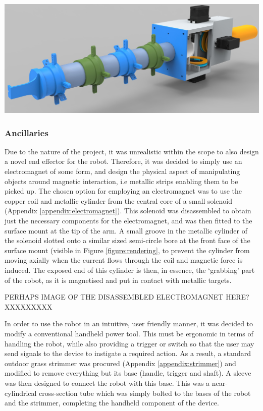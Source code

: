 \documentclass[11pt]{article}
\begin{document}
\begin{center}
\includegraphics[width=\textwidth]{images/rendering.png}
\label{figure:rendering}
\end{center}

\subsubsection{Ancillaries}
Due to the nature of the project, it was unrealistic within the scope to also design a novel end effector for the robot. Therefore, it was decided to simply use an electromagnet of some form, and design the physical aspect of manipulating objects around magnetic interaction, i.e metallic strips enabling them to be picked up. The chosen option for employing an electromagnet was to use the copper coil and metallic cylinder from the central core of a small solenoid (Appendix \ref{appendix:electromagnet}). This solenoid was disassembled to obtain just the necessary components for the electromagnet, and was then fitted to the surface mount at the tip of the arm. A small groove in the metallic cylinder of the solenoid slotted onto a similar sized semi-circle bore at the front face of the surface mount (visible in Figure \ref{figure:rendering}, to prevent the cylinder from moving axially when the current flows through the coil and magnetic force is induced. The exposed end of this cylinder is then, in essence, the `grabbing' part of the robot, as it is magnetised and put in contact with metallic targets.

PERHAPS IMAGE OF THE DISASSEMBLED ELECTROMAGNET HERE? XXXXXXXXX

In order to use the robot in an intuitive, user friendly manner, it was decided to modify a conventional handheld power tool. This must be ergonomic in terms of handling the robot, while also providing a trigger or switch so that the user may send signals to the device to instigate a required action. As a result, a standard outdoor grass strimmer was procured (Appendix \ref{appendix:strimmer}) and modified to remove everything but its base (handle, trigger and shaft). A sleeve was then designed to connect the robot with this base. This was a near-cylindrical cross-section tube which was simply bolted to the bases of the robot and the strimmer, completing the handheld component of the device.
\end{document}

